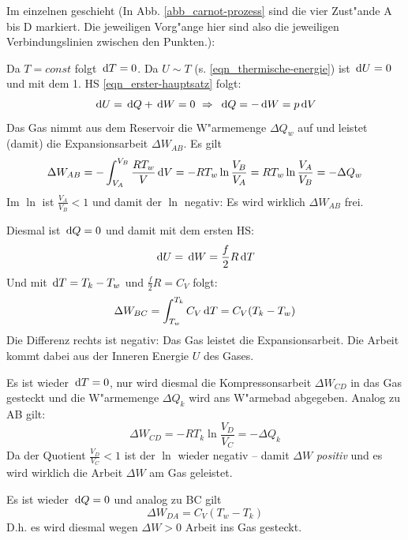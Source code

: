Im einzelnen geschieht (In Abb. \ref{abb_carnot-prozess} sind die vier
Zust"ande A bis D markiert. Die jeweiligen Vorg"ange hier sind also die
jeweiligen Verbindungslinien zwischen den Punkten.):
\begin{description}[\setlabelstyle{\bfseries\slshape}]
\item[A$\to$B Isotherme Expansion] 
Da $T = const$ folgt $\, \mathrm{d} T = 0$. Da $U \sim T$
(s. \eqref{eqn_thermische-energie}) ist $\, \mathrm{d} U = 0$ und mit dem
1. HS \eqref{eqn_erster-hauptsatz} folgt:
$$
 \, \mathrm{d} U = \, \mathrm{d} Q + \, \mathrm{d} W = 0 ~ \Rightarrow ~ \, \mathrm{d} Q = -
 {\, \mathrm{d} W} = {p \, \mathrm{d} V}
$$
Das Gas nimmt aus dem Reservoir die W"armemenge $\Delta Q_w$ auf und
leistet (damit) die Expansionsarbeit $\Delta W_{AB}$. Es gilt
$$
\Delta W_{ AB } = -\int_{ V_A }^{ V_B } \frac{RT_w}{V}\, \mathrm{d} V = -RT_w \ln
\frac{V_B}{V_A} = RT_w \ln\frac{V_A}{V_B} = -\Delta Q_{ w }
$$
Im $\ln$ ist $\frac{V_A}{V_B} < 1$ und damit der $\ln$ negativ: Es
wird wirklich $\Delta W_{AB}$ frei.


\item[B$\to$C adiabatische Expansion] 
Diesmal ist $\, \mathrm{d} Q = 0$ und damit mit dem ersten HS: 
$$
\, \mathrm{d} U = \, \mathrm{d} W = \frac{f}{2} R \, \mathrm{d} T
$$
Und mit $\, \mathrm{d} T = T_k - T_w$ und $\frac{f}{2}R = C_V$ folgt:
$$
\Delta W_{ BC } = \int_{ T_w }^{ T_k } C_V \, \mathrm{d} T = C_V(T_k - T_w)
$$
Die Differenz rechts ist negativ: Das Gas leistet die
Expansionsarbeit. Die Arbeit kommt dabei aus der Inneren Energie $U$
des Gases.


\item[C$\to$D isotherme Kompression] 
Es ist wieder $\, \mathrm{d} T = 0$, nur wird diesmal die Kompressonsarbeit
$\Delta W_{ CD }$ in das Gas gesteckt und die W"armemenge $\Delta Q_k$
wird ans W"armebad abgegeben. Analog zu AB gilt:
$$
\Delta W_{ CD } = -RT_k \ln \frac{V_D}{V_C} = -\Delta Q_k
$$
Da der Quotient $\frac{V_D}{V_C} < 1$ ist der $\ln$ wieder negativ --
damit $\Delta W$ \emph{positiv} und es wird wirklich die Arbeit
$\Delta W$ am Gas geleistet.


\item[D$\to$A adiabatische Kompression] 
Es ist wieder $\, \mathrm{d} Q = 0$ und analog zu BC gilt
$$
 \Delta W_{ DA } = C_V(T_w - T_k)
$$
D.h. es wird diesmal wegen $\Delta W > 0$ Arbeit ins Gas gesteckt.
\end{description}




